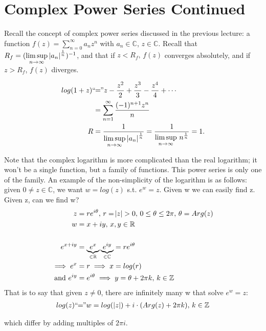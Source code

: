 
\setcounter{section}{0}
\setcounter{theorem}{0}

\section{Complex Power Series Continued}

Recall the concept of complex power series discussed in the previous lecture: a function $f(z) = \sum_{n=0}^\infty a_nz^n$ with $a_n \in \mathbb{C}$, $z\in \mathbb{C}$. Recall that $R_f=( \limsup\limits_{n\rightarrow \infty} \, \abs{a_n}^\frac{1}{n} )^{-1}$, and that if $z<R_f, \, f(z)$ converges absolutely, and if $z>R_f$, $f(z)$ diverges.

\begin{example}[Logarithm]
\begin{align*}
    log(1+z)  `` \! \! &= \! \!"  z - \frac{z^2}{2} +\frac{z^3}{3} - \frac{z^4}{4} + \cdots\\
    &= \sum_{n=1}^\infty \frac{(-1)^{n+1}z^n}{n}\\
    R&=\frac{1}{\limsup\limits_{n\rightarrow \infty} \, \abs{a_n}^\frac{1}{n}} = \frac{1}{\limsup\limits_{n\rightarrow \infty} \, n^\frac{1}{n}} = 1.
\end{align*}

Note that the complex logarithm is more complicated than the real logarithm; it won't be a single function, but a family of functions. This power series is only one of the family. An example of the non-simplicity of the logarithm is as follows: given $0 \neq z \in \mathbb{C}$, we want $w=log(z)$ s.t. $e^w=z$. Given w we can easily find z. Given z, can we find w?
\begin{align*}
    z&=re^{i\theta}, \, r=\abs{z}>0, \, 0 \leq \theta \leq 2\pi, \, \theta = Arg(z)\\
    w&=x+iy, \, x,y\in \mathbb{R}\\\\
    e^{x+iy} &= 
    \underbrace{e^x}_{\in \mathbb{R}} \underbrace{e^{iy}}_{\in \mathbb{C}} = re^{i\theta}\\ \implies e^x &=r \implies x=log(r)\\
   \text{and } e^{iy} &= e^{i\theta} \implies y = \theta +2\pi k, \, k\in \mathbb{Z}
\end{align*}
That is to say that given $z\neq 0$, there are infinitely many w that solve $e^w=z$:
\begin{align*}
    log(z) `` \! \! = \! \! " w = log ( \,  \abs{z} )  + i\cdot (Arg(z) +2\pi k), \, k\in \mathbb{Z}
\end{align*}


which differ by adding multiples of $2 \pi i$.
\end{example}

